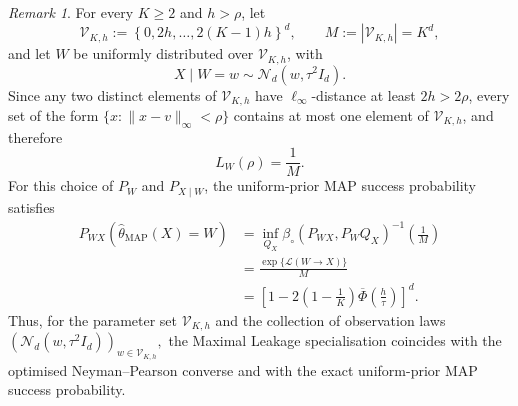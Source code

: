 \documentclass[11pt]{article}
\theoremstyle{definition}
\theoremstyle{remark}
\newtheorem{remark}[theorem]{Remark}
\newcommand{\1}{\boldsymbol{1}}
\newcommand{\ml}[2]{\mathcal{L}(#1\!\to\!#2)}
\begin{document}
\begin{remark}
For every $K\geq2$ and $h>\rho$, let
\[
\mathcal V_{K,h}
:=
\left\{
0,2h,\ldots,2(K-1)h
\right\}^d,
\qquad
M:=|\mathcal V_{K,h}|=K^d,
\]
and let $W$ be uniformly distributed over $\mathcal V_{K,h}$, with
\[
X\mid W=w
\sim
\mathcal N_d(w,\tau^2I_d).
\]
Since any two distinct elements of $\mathcal V_{K,h}$ have
$\ell_\infty$-distance at least $2h>2\rho$, every set of the form
$\{x:\|x-v\|_\infty<\rho\}$ contains at most one element of
$\mathcal V_{K,h}$, and therefore
\[
L_W(\rho)=\frac1M.
\]
For this choice of $P_W$ and $P_{X\mid W}$, the uniform-prior MAP
success probability satisfies
\begin{align}
P_{WX}
\left(
\widehat\theta_{\mathrm{MAP}}(X)=W
\right)
&=
\inf_{Q_X}
\beta_{\circ}(P_{WX},P_WQ_X)^{-1}
\left(\frac1M\right)\\
&=
\frac{\exp\{\ml{W}{X}\}}{M}\\
&=
\left[
1-
2\left(1-\frac1K\right)
\overline\Phi\left(\frac{h}{\tau}\right)
\right]^d.
\end{align}
Thus, for the parameter set $\mathcal V_{K,h}$ and the collection of
observation laws
\(
\left(
\mathcal N_d(w,\tau^2I_d)
\right)_{w\in\mathcal V_{K,h}},
\)
the Maximal Leakage specialisation coincides with the optimised
Neyman--Pearson converse and with the exact uniform-prior MAP success
probability.


\end{remark}
\end{document}
